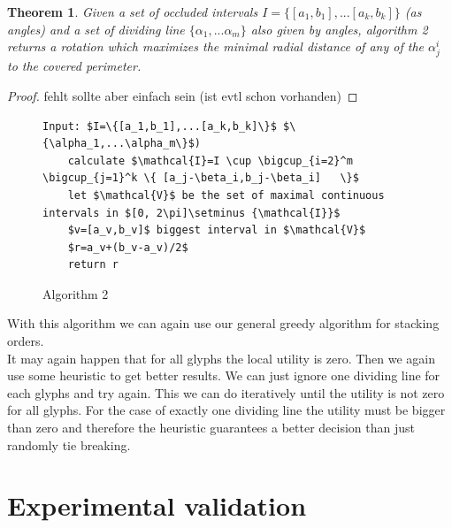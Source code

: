\documentclass[a4paper,11pt]{article}
\newtheorem{theorem}{Theorem}
\begin{document}
\begin{theorem}
Given a set of occluded intervals $I=\{[a_1,b_1],...[a_k,b_k]\}$ (as angles) and a set of dividing line $\{\alpha_1,...\alpha_m\}$ also given by angles, algorithm 2 returns a rotation which maximizes the minimal radial distance of any of the $\alpha^i_j$ to the covered perimeter.
\end{theorem} 
\begin{proof}
\color{blue}
fehlt sollte aber einfach sein (ist evtl schon vorhanden)
\color{black}
\end{proof}
\begin{figure}[!bth]
\begin{lstlisting}[mathescape=true ]
Input: $I=\{[a_1,b_1],...[a_k,b_k]\}$ $\{\alpha_1,...\alpha_m\}$)
	calculate $\mathcal{I}=I \cup \bigcup_{i=2}^m    \bigcup_{j=1}^k \{ [a_j-\beta_i,b_j-\beta_i]   \}$	
	let $\mathcal{V}$ be the set of maximal continuous intervals in $[0, 2\pi]\setminus {\mathcal{I}}$
	$v=[a_v,b_v]$ biggest interval in $\mathcal{V}$
	$r=a_v+(b_v-a_v)/2$
	return r
\end{lstlisting}
\caption{Algorithm 2}
\end{figure}
With this algorithm we can again use our general greedy algorithm for stacking orders.\\
It may again happen that for all glyphs the local utility is zero. Then we again use some heuristic to get better results. We can just ignore one dividing line for each glyphs and try again. This we can do iteratively until the utility is not zero for all glyphs. For the case of exactly one dividing line the utility must be bigger than zero and therefore the heuristic guarantees a better decision than just randomly tie breaking.




\newpage

\section{Experimental validation}

\end{document}
